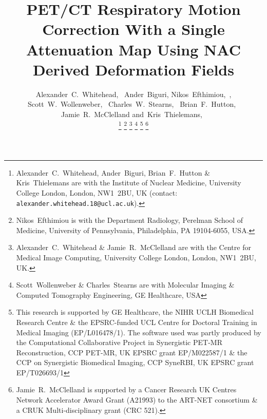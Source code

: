 \documentclass[10pt, twocolumn, twoside, letterpaper]{IEEEtran}
\begin{document}
\title{PET/CT Respiratory Motion Correction With a Single Attenuation Map Using NAC Derived Deformation Fields}

\pagestyle{plain}

\author{Alexander~C.~Whitehead,~
        Ander~Biguri,
        Nikos~Efthimiou,~,
        Scott~W.~Wollenweber,~
        Charles~W.~Stearns,~
        Brian~F.~Hutton,~
        Jamie~R.~McClelland
        and~Kris~Thielemans,~%
        
    \vspace{-1.0cm}

    \thanks{Alexander~C.~Whitehead, Ander~Biguri, Brian~F.~Hutton \& Kris~Thielemans are with the Institute of Nuclear Medicine, University College London, London, NW1~2BU, UK (contact: \texttt{alexander.whitehead.18@ucl.ac.uk}).}%
    \thanks{Nikos~Efthimiou is with the Department Radiology, Perelman School of Medicine, University of Pennsylvania, Philadelphia, PA 19104-6055, USA.}%
    \thanks{Alexander~C.~Whitehead \& Jamie~R.~McClelland are with the Centre for Medical Image Computing, University College London, London, NW1~2BU, UK.}%
    \thanks{Scott~Wollenweber \& Charles~Stearns are with Molecular Imaging \& Computed Tomography Engineering, GE Healthcare, USA}%
    \thanks{This research is supported by GE Healthcare, the NIHR UCLH Biomedical Research Centre \& the EPSRC-funded UCL Centre for Doctoral Training in Medical Imaging (EP/L016478/1). The software used was partly produced by the Computational Collaborative Project in Synergistic PET-MR Reconstruction, CCP PET-MR, UK EPSRC grant EP/M022587/1 \& the CCP on Synergistic Biomedical Imaging, CCP SyneRBI, UK EPSRC grant EP/T026693/1}%
    \thanks{Jamie~R.~McClelland is supported by a Cancer Research UK Centres Network Accelerator Award Grant (A21993) to the ART-NET consortium \& a CRUK Multi-disciplinary grant (CRC 521).}%
}

\maketitle
\IEEEpeerreviewmaketitle
\end{document}
